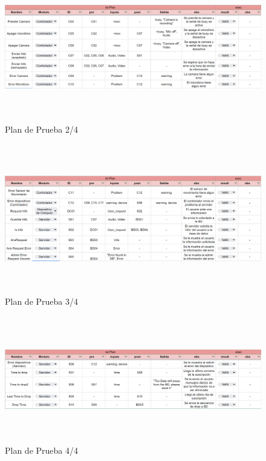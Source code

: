 \begin{figure}[!h]
    \centering
    \includegraphics[width=16.5cm, height=6.5cm]{images/PDP2.PNG}
    \caption{Plan de Prueba 2/4}
    \label{fig:PDP2}
\end{figure}

\begin{figure}[!h]
    \centering
    \includegraphics[width=16.5cm, height=6.5cm]{images/PDP3.PNG}
    \caption{Plan de Prueba 3/4}
    \label{fig:PDP3}
\end{figure}

\begin{figure}[!h]
    \centering
    \includegraphics[width=16.5cm, height=5.5cm]{images/PDP4.PNG}
    \caption{Plan de Prueba 4/4}
    \label{fig:PDP4}
\end{figure}

